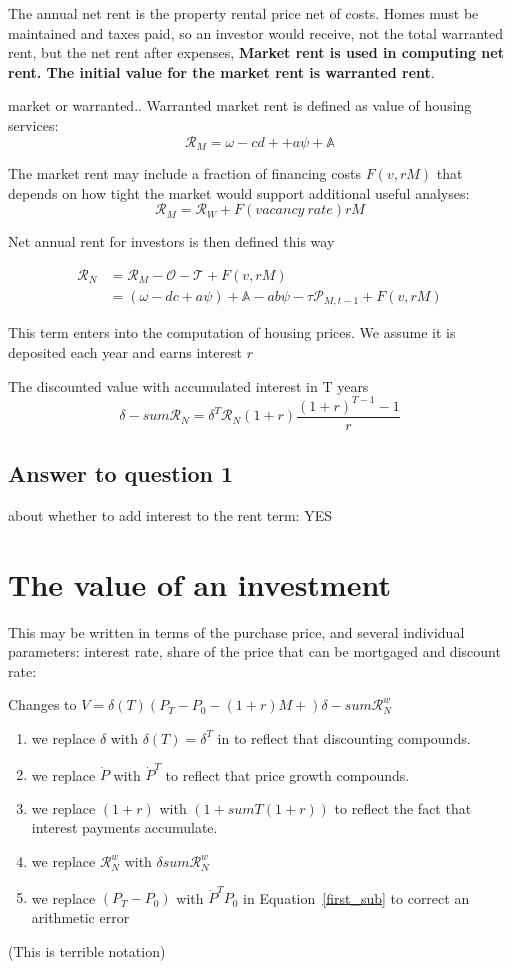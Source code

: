 The annual \gls{net rent} is the property rental price  net of costs. Homes must be maintained and taxes paid, so an investor would receive, not the total warranted rent, but the net rent after expenses,
\textbf{Market rent is used in computing net rent. The initial value for the market rent is \gls{warranted rent}}.

market or warranted..
Warranted market rent is defined as value of housing services:
\[\mathcal{R}_M = \omega - cd+ + a\psi + \mathbb{A}\]

The market rent may include  a fraction of financing costs $F(v, rM)$  that depends on how tight the market would support additional useful analyses:
 \[\mathcal{R}_M=\mathcal{R}_W + F(vacancy\ rate) rM\]

Net annual rent for investors is then  defined this way 

\begin{align}\mathcal{R}_N &= \mathcal{R}_M - \mathcal{O} - \mathcal{T} + F(v, rM)\nonumber\\
&= (\omega - {dc} + a\psi )+ \mathbb{A} - a b \psi - \tau  \mathcal{P}_{M, t-1}  + F(v, rM)
\end{align}

This term enters into the computation of housing prices. We assume it is deposited each year and earns interest $r$

The discounted value with accumulated interest in T years 
\[\delta-sum\mathcal{R}_N=\delta^T\mathcal{R}_N (1+r)\frac{(1+r)^{T-1}-1}{r} \]


\subsection{Answer to question 1} about whether to add interest to the rent term: YES

\section{The value of an investment}
 
 This may be written in terms of the purchase price, and several individual parameters: interest  rate, share of the price that can be mortgaged and  discount rate: 

 Changes to $V = \delta(T) \left(P_T -P_0- (1+r)M + \right)  \delta-sum\mathcal{R}^w_N $
 \begin{enumerate}
     \item we replace $\delta$ with $\delta(T) = \delta^T$ in  to reflect that discounting compounds. 
     \item we replace $\dot P$ with $\dot P^T$ to reflect that price growth compounds. 
     \item we replace $(1+r)$ with $(1 + sumT(1+r))$ to reflect the fact that interest payments accumulate.  
     \item we replace $\mathcal{R}^w_N$ with $\delta sum\mathcal{R}^w_N$
     \item we replace $(P_T - P_0)$ with $\dot P^T P_0$ in Equation~\ref{first_sub} to correct an arithmetic error
\end{enumerate} 
(This is terrible notation)
